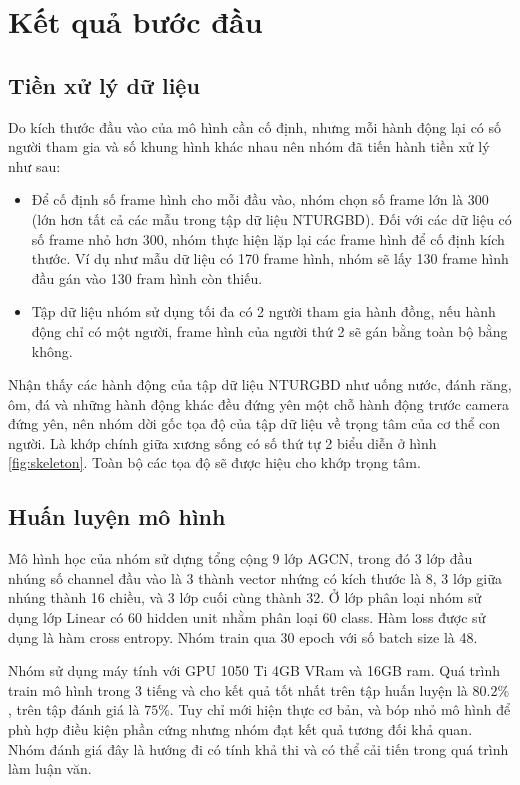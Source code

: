 \section{Kết quả bước đầu}
\label{section:result}

\subsection{Tiền xử lý dữ liệu}

Do kích thước đầu vào của mô hình cần cố định, nhưng mỗi hành động lại có số người tham gia và số khung hình khác nhau nên nhóm đã tiến hành tiền xử lý như sau:

\begin{itemize}
    \item Để cố định số frame hình cho mỗi đầu vào, nhóm chọn số frame lớn là 300 (lớn hơn tất cả các mẫu trong tập dữ liệu NTURGBD). Đối với các dữ liệu có số frame nhỏ hơn 300, nhóm thực hiện lặp lại các frame hình để  cố định kích thước. Ví dụ như mẫu dữ liệu có 170 frame hình, nhóm sẽ lấy 130 frame hình đầu gán vào 130 fram hình còn thiếu.
    \item Tập dữ liệu nhóm sử dụng tối đa có 2 người tham gia hành đồng, nếu hành động chỉ có một người, frame hình của người thứ 2 sẽ gán bằng toàn bộ bằng không.
\end{itemize}

Nhận thấy các hành động của tập dữ liệu NTURGBD như uống nước, đánh răng, ôm, đá và những hành động khác đều đứng yên một chỗ hành động trước camera đứng yên, nên nhóm dời gốc tọa độ của tập dữ liệu về trọng tâm của cơ thể con người. Là khớp chính giữa xương sống có số thứ tự 2 biểu diễn ở hình \ref{fig:skeleton}. Toàn bộ các tọa độ sẽ được hiệu cho khớp trọng tâm.

\subsection{Huấn luyện mô hình}

Mô hình học của nhóm sử dựng tổng cộng 9 lớp AGCN, trong đó 3 lớp đầu nhúng số channel đầu vào là 3 thành vector nhứng có kích thước là 8, 3 lớp giữa nhúng thành 16 chiều, và 3 lớp cuối cùng thành 32. Ở lớp phân loại nhóm sử dụng lớp Linear có 60 hidden unit nhằm phân loại 60 class. Hàm loss được sử dụng là hàm cross entropy. Nhóm train qua 30 epoch với số batch size là 48.

Nhóm sử dụng máy tính với GPU 1050 Ti 4GB VRam và 16GB ram. Quá trình train mô hình trong 3 tiếng và cho kết quả tốt nhất trên tập huấn luyện là $80.2\%$, trên tập đánh giá là $75\%$. Tuy chỉ mới hiện thực cơ bản, và bóp nhỏ mô hình để phù hợp điều kiện phần cứng nhưng nhóm đạt kết quả tương đối khả quan. Nhóm đánh giá đây là hướng đi có tính khả thi và có thể cải tiến trong quá trình làm luận văn.

